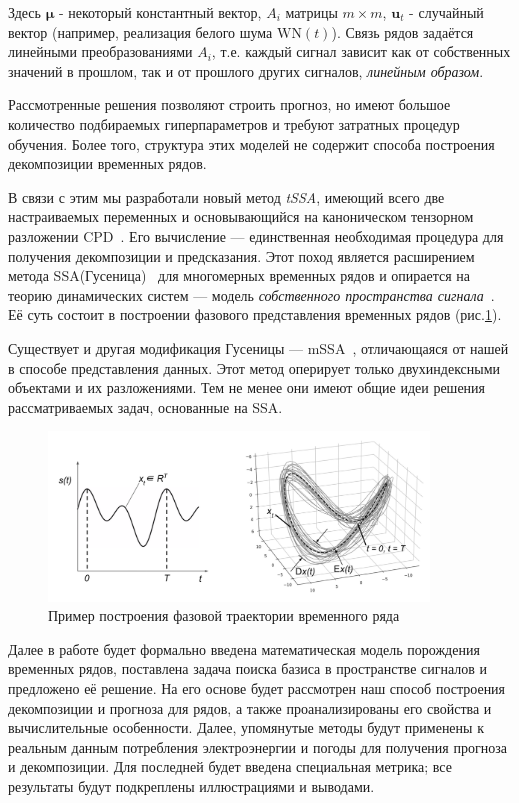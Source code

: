 		Здесь $ \boldsymbol{\mu} $ - некоторый константный вектор, $ A_i $ матрицы $ m \times m $, $ \mathbf{u}_t $ - случайный вектор (например, реализация белого шума $ \text{WN}(t) $). Связь рядов задаётся линейными преобразованиями $ A_i $, т.е. каждый сигнал зависит как от собственных значений в прошлом, так и от прошлого других сигналов, \textit{линейным образом}. 	
		
		Рассмотренные решения позволяют строить прогноз, но имеют большое количество подбираемых гиперпараметров и требуют затратных процедур обучения. Более того, структура этих моделей не содержит способа построения декомпозиции временных рядов. 
		
		В связи с этим мы разработали новый метод \emph{tSSA}, имеющий всего две настраиваемых переменных и основывающийся на каноническом тензорном разложении CPD~\cite{kolda_tensors}. Его вычисление --- единственная необходимая процедура для получения декомпозиции и предсказания. Этот поход является расширением метода SSA(Гусеница)~\cite{ecfb9dc578be43ae9ee8fc88b8ff9151} для многомерных временных рядов и опирается на теорию динамических систем --- модель \textit{собственного пространства сигнала}~\cite{1572261550523548160}. Её суть состоит в построении фазового представления временных рядов (рис.\ref{pic:phase_traj}). 
		
		Существует и другая модификация Гусеницы --- mSSA~\cite{mSSA_overview}, отличающаяся от нашей в способе представления данных. Этот метод оперирует только двухиндексными объектами и их разложениями. Тем не менее они имеют общие идеи решения рассматриваемых задач, основанные на SSA.
		
		\begin{figure}[h]
			\centering
			\includegraphics[width=0.9\textwidth, keepaspectratio]{../figs/phase_traj.png}
			\caption{Пример построения фазовой траектории временного ряда}\label{pic:phase_traj}
		\end{figure}
		
		Далее в работе будет формально введена математическая модель порождения временных рядов, поставлена задача поиска базиса в пространстве сигналов и предложено её решение. На его основе будет рассмотрен наш способ построения декомпозиции и прогноза для рядов, а также проанализированы его свойства и вычислительные особенности. Далее, упомянутые методы будут применены к реальным данным потребления электроэнергии и погоды для получения прогноза и декомпозиции. Для последней будет введена специальная метрика; все результаты будут подкреплены иллюстрациями и выводами.
		 
